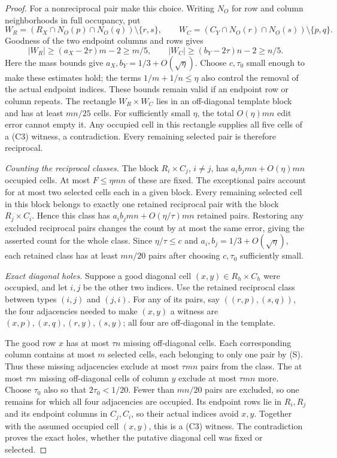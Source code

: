 \documentclass[11pt]{article}
\begin{document}
\begin{proof}
For a nonreciprocal pair make this choice. Writing $N_O$ for row and
column neighborhoods in full occupancy, put
\[
 W_R=(R_X\cap N_O(p)\cap N_O(q))\setminus\{r,s\},\qquad
 W_C=(C_Y\cap N_O(r)\cap N_O(s))\setminus\{p,q\}.
\]
Goodness of the two endpoint columns and rows gives
\[
 |W_R|\ge(a_X-2\tau)m-2\ge m/5,\qquad
 |W_C|\ge(b_Y-2\tau)n-2\ge n/5.
\]
Here the mass bounds give $a_X,b_Y=1/3+O(\sqrt\eta)$.
Choose $c,\tau_0$ small enough to make these estimates hold; the terms
$1/m+1/n\le\eta$ also control the removal of the actual endpoint
indices. These bounds remain valid if an endpoint row or column repeats.
The rectangle $W_R\times W_C$ lies in an off-diagonal template block
and has at least $mn/25$ cells. For sufficiently small $\eta$, the total
$O(\eta)mn$ edit error cannot empty it. Any occupied cell in this
rectangle supplies all five cells of a (C3) witness, a contradiction.
Every remaining selected pair is therefore reciprocal.

\smallskip\noindent\emph{Counting the reciprocal classes.}
The block $R_i\times C_j$, $i\ne j$, has
$a_i b_jmn+O(\eta)mn$ occupied cells. At most $F\le\eta mn$ of
these are fixed. The exceptional pairs account for at most two selected
cells each in a given block. Every remaining selected cell
in this block belongs to exactly one retained reciprocal pair with the
block $R_j\times C_i$. Hence this class has
$a_i b_jmn+O(\eta/\tau)mn$ retained pairs. Restoring any excluded
reciprocal pairs changes the count by at most the same error, giving
the asserted count for the whole class. Since $\eta/\tau\le c$ and
$a_i,b_j=1/3+O(\sqrt\eta)$, each retained class has at least $mn/20$
pairs after choosing $c,\tau_0$ sufficiently small.

\smallskip\noindent\emph{Exact diagonal holes.}
Suppose a good diagonal cell $(x,y)\in R_h\times C_h$ were occupied,
and let $i,j$ be the other two indices. Use the retained reciprocal
class between types $(i,j)$ and $(j,i)$. For any of its pairs, say
$((r,p),(s,q))$, the four adjacencies needed to make $(x,y)$ a witness
are $(x,p),(x,q),(r,y),(s,y)$; all four are off-diagonal in the template.

The good row $x$ has at most $\tau n$ missing off-diagonal cells.
Each corresponding column contains at most $m$ selected cells, each
belonging to only one pair by (S). Thus these missing adjacencies
exclude at most $\tau mn$ pairs from the class. The at most $\tau m$
missing off-diagonal cells of column $y$ exclude at most $\tau mn$
more. Choose $\tau_0$ also so that $2\tau_0<1/20$.
Fewer than $mn/20$ pairs are excluded, so one remains for which all
four adjacencies are occupied. Its endpoint rows lie in $R_i,R_j$ and
its endpoint columns in $C_j,C_i$, so their actual indices avoid $x,y$.
Together with the assumed occupied cell $(x,y)$, this is a (C3) witness.
The contradiction proves the exact holes, whether the putative diagonal
cell was fixed or selected.


\end{proof}
\end{document}
